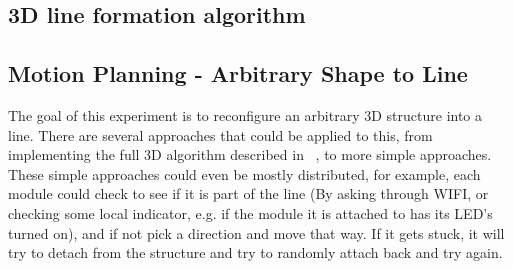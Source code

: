 \subsection{3D line formation algorithm}
\label{sec:algLine}
\subsection{Motion Planning - Arbitrary Shape to Line}
\label{ssec:line}
The goal of this experiment is to reconfigure an arbitrary 3D structure into a line. There are several approaches that could be applied to this, from implementing the full 3D algorithm described in ~\cite{sung2015reconfiguration}, to more simple approaches. These simple approaches could even be mostly distributed, for example, each module could check to see if it is part of the line (By asking through WIFI, or checking some local indicator, e.g. if the module it is attached to has its LED's turned on), and if not pick a direction and move that way. If it gets stuck, it will try to detach from the structure and try to randomly attach back and try again.

